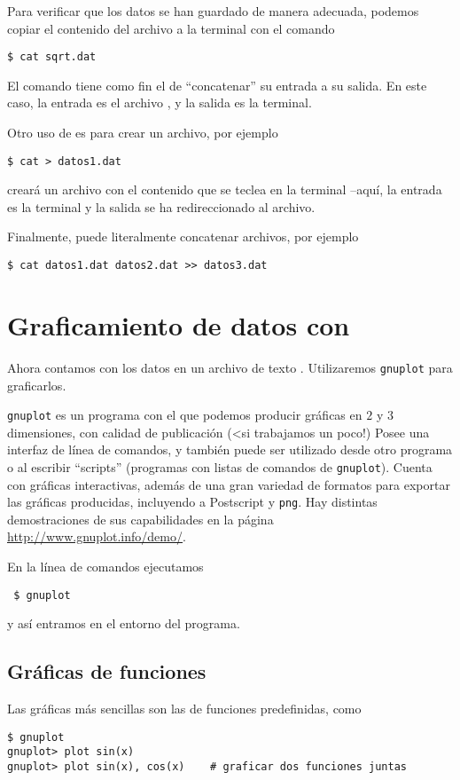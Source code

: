Para verificar que los datos se han guardado de manera adecuada, podemos copiar
el contenido del archivo a la terminal con el comando
\begin{lstlisting}
$ cat sqrt.dat
\end{lstlisting}
El comando  tiene como fin el de ``concatenar'' su entrada a su salida.
En este caso, la entrada es el archivo , y la salida es la
terminal.

Otro uso de  es para crear un archivo, por ejemplo
\begin{lstlisting}
$ cat > datos1.dat
\end{lstlisting}
creará un archivo  con el contenido que se teclea en la
terminal --aquí, la entrada es la terminal y la salida se ha redireccionado al
archivo.

Finalmente,  puede literalmente concatenar archivos, por ejemplo
\begin{lstlisting}
$ cat datos1.dat datos2.dat >> datos3.dat
\end{lstlisting}

\section{Graficamiento de datos con }
Ahora contamos con los datos en un archivo de texto .
Utilizaremos \texttt{gnuplot} para graficarlos.

\texttt{gnuplot} es un programa con el que podemos producir gráficas
en $2$ y $3$
dimensiones, con calidad de publicación (<si trabajamos un poco!)
 Posee una interfaz de línea de comandos, y
también puede ser utilizado desde otro programa o al escribir ``scripts'' 
(programas con listas de comandos de \texttt{gnuplot}).
Cuenta con gráficas interactivas, además de 
una gran variedad de formatos para exportar las gráficas producidas, 
incluyendo a Postscript y \texttt{png}.
Hay distintas demostraciones de sus capabilidades en la página
\url{http://www.gnuplot.info/demo/}.

En la línea de comandos ejecutamos
\begin{lstlisting}
 $ gnuplot
\end{lstlisting}
y así entramos en el entorno del programa.



\subsection{Gráficas de funciones}
Las gráficas más sencillas son las de funciones predefinidas, como
\begin{lstlisting}
$ gnuplot
gnuplot> plot sin(x)
gnuplot> plot sin(x), cos(x) 	# graficar dos funciones juntas
\end{lstlisting}

